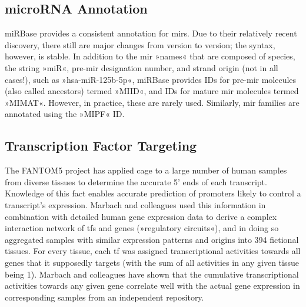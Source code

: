 \subsection{microRNA Annotation}
miRBase provides a consistent annotation for \acp{mir}. Due to their relatively recent discovery, there still are major changes from version to version; the syntax, however, is stable. In addition to the \ac{mir} »names« that are composed of species, the string »miR«, pre-\ac{mir} designation number, and strand origin (not in all cases!), such as »hsa-miR-125b-5p«, miRBase provides IDs for pre-\ac{mir} molecules (also called ancestors) termed »MIID«, and IDs for mature \ac{mir} molecules termed »MIMAT«. However, in practice, these are rarely used. Similarly, \ac{mir} families are annotated using the »MIPF« ID.

\subsection{Transcription Factor Targeting} \label{sec:database:tf}
The FANTOM5 project has applied \ac{cage} to a large number of human samples from diverse tissues to determine the accurate 5' ends of each transcript\cite{Hon2017}. Knowledge of this fact enables accurate prediction of promoters likely to control a transcript's expression. Marbach and colleagues used this information in combination with detailed human gene expression data to derive a complex interaction network of \acp{tf} and genes (»regulatory circuits«), and in doing so aggregated samples with similar expression patterns and origins into 394 fictional tissues\cite{Marbach2016}. For every tissue, each \ac{tf} was assigned transcriptional activities towards all genes that it supposedly targets (with the sum of all activities in any given tissue being \num{1}). Marbach and colleagues have shown that the cumulative transcriptional activities towards any given gene correlate well with the actual gene expression in corresponding samples from an independent repository.

